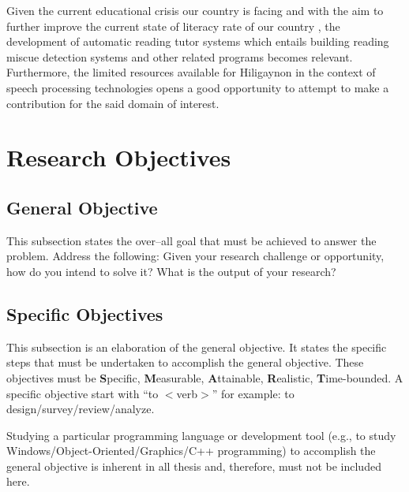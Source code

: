 Given the current educational crisis our country is facing \cite{unicef-2022} and with the aim to further improve the current state of  literacy rate of our country \cite{hernandez-2020}, the development of automatic reading tutor systems which entails building reading miscue detection systems and other related programs becomes relevant. Furthermore, the limited resources available for Hiligaynon in the context of speech processing technologies opens a good opportunity to attempt to make a contribution for the said domain of interest.

\section{Research Objectives}
\label{sec:researchobjectives}

\subsection{General Objective}
\label{sec:generalobjective}

This subsection states the over--all goal that must be achieved to answer the problem.
Address the following: Given your research challenge or opportunity, how do you intend  to solve it? What is the output of your research?


\subsection{Specific Objectives}
\label{sec:specificobjectives}

%
%

This subsection is an elaboration of the general objective.  
It states the specific steps that must be undertaken to accomplish the general objective.  
These objectives must be \textbf{S}pecific, \textbf{M}easurable, \textbf{A}ttainable, \textbf{R}ealistic, \textbf{T}ime-bounded.  
A specific objective start with ``to $<$verb$>$'' for example: to design/survey/review/analyze.

Studying a particular programming language or development tool (e.g., to study Windows/Object-Oriented/Graphics/C++ programming) to  accomplish the general objective is inherent in all thesis and, therefore, must not be included here.


